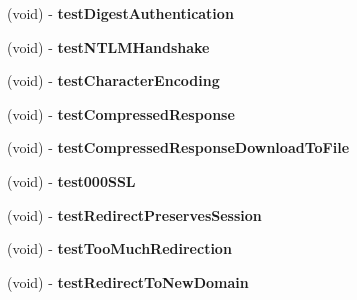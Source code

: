 \begin{DoxyCompactItemize}
\item 
\hypertarget{interface_a_s_i_h_t_t_p_request_tests_a66b1d1d52e3faaadb334efa3ca93351e}{
(void) -\/ {\bfseries test\-Digest\-Authentication}}
\label{interface_a_s_i_h_t_t_p_request_tests_a66b1d1d52e3faaadb334efa3ca93351e}

\item 
\hypertarget{interface_a_s_i_h_t_t_p_request_tests_a42b76a1c974d5b1b8ff1a22a20381b06}{
(void) -\/ {\bfseries test\-N\-T\-L\-M\-Handshake}}
\label{interface_a_s_i_h_t_t_p_request_tests_a42b76a1c974d5b1b8ff1a22a20381b06}

\item 
\hypertarget{interface_a_s_i_h_t_t_p_request_tests_ae25e5af72786306a726678b3e50efa71}{
(void) -\/ {\bfseries test\-Character\-Encoding}}
\label{interface_a_s_i_h_t_t_p_request_tests_ae25e5af72786306a726678b3e50efa71}

\item 
\hypertarget{interface_a_s_i_h_t_t_p_request_tests_ae884e3724fa16e86e2c9f202fafb0832}{
(void) -\/ {\bfseries test\-Compressed\-Response}}
\label{interface_a_s_i_h_t_t_p_request_tests_ae884e3724fa16e86e2c9f202fafb0832}

\item 
\hypertarget{interface_a_s_i_h_t_t_p_request_tests_ad9fe5125c3c071c35369d0df17222250}{
(void) -\/ {\bfseries test\-Compressed\-Response\-Download\-To\-File}}
\label{interface_a_s_i_h_t_t_p_request_tests_ad9fe5125c3c071c35369d0df17222250}

\item 
\hypertarget{interface_a_s_i_h_t_t_p_request_tests_a91af84b41f3a46f64d16095adb340214}{
(void) -\/ {\bfseries test000\-S\-S\-L}}
\label{interface_a_s_i_h_t_t_p_request_tests_a91af84b41f3a46f64d16095adb340214}

\item 
\hypertarget{interface_a_s_i_h_t_t_p_request_tests_a3132c64a767dc4789eedb611544874b7}{
(void) -\/ {\bfseries test\-Redirect\-Preserves\-Session}}
\label{interface_a_s_i_h_t_t_p_request_tests_a3132c64a767dc4789eedb611544874b7}

\item 
\hypertarget{interface_a_s_i_h_t_t_p_request_tests_abdde777c6d2c53c38bbbd414f01ab11c}{
(void) -\/ {\bfseries test\-Too\-Much\-Redirection}}
\label{interface_a_s_i_h_t_t_p_request_tests_abdde777c6d2c53c38bbbd414f01ab11c}

\item 
\hypertarget{interface_a_s_i_h_t_t_p_request_tests_a0e46e6d0e9b2075145255c89cb0f23ae}{
(void) -\/ {\bfseries test\-Redirect\-To\-New\-Domain}}
\label{interface_a_s_i_h_t_t_p_request_tests_a0e46e6d0e9b2075145255c89cb0f23ae}


\end{DoxyCompactItemize}
